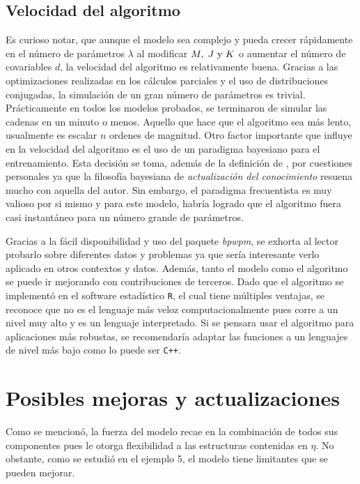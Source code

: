\documentclass[../Main/Main.tex]{subfiles}
\begin{document}
\subsection*{Velocidad del algoritmo}
Es curioso notar, que aunque el modelo sea complejo y pueda crecer rápidamente en el número de parámetros $\lambda$ al modificar $M,\;J\text{ y }K$ o aumentar el número de covariables $d$, la velocidad del algoritmo es relativamente buena. Gracias a las optimizaciones realizadas en los cálculos parciales y el uso de distribuciones conjugadas, la simulación de un gran número de parámetros es trivial. Prácticamente en todos los modelos probados, se terminaron de simular las cadenas en un minuto o menos. Aquello que hace que el algoritmo sea más lento, usualmente es escalar $n$ ordenes de magnitud. Otro factor importante que influye en la velocidad del algoritmo es el uso de un paradigma bayesiano para el entrenamiento. Esta decisión se toma, además de la definición de \citet{albert1993bayesian}, por cuestiones personales ya que la filosofía bayesiana de \textit{actualización del conocimiento} resuena mucho con aquella del autor. Sin embargo, el paradigma frecuentista es muy valioso por si mismo y para este modelo, habría logrado que el algoritmo fuera casi instantáneo para un número grande de parámetros.

Gracias a la fácil disponibilidad y uso del paquete \textit{bpwpm}, se exhorta al lector probarlo sobre diferentes datos y problemas ya que sería interesante verlo aplicado en otros contextos y datos. Además, tanto el modelo como el algoritmo se puede ir mejorando con contribuciones de terceros. Dado que el algoritmo se implementó en el software estadístico \verb|R|, el cual tiene múltiples ventajas, se reconoce que no es el lenguaje más veloz computacionalmente pues corre a un nivel muy alto y es un lenguaje interpretado. Si se pensara usar el algoritmo para aplicaciones más robustas, se recomendaría adaptar las funciones a un lenguajes de nivel más bajo como lo puede ser \verb|C++|.

\section{Posibles mejoras y actualizaciones}
Como se mencionó, la fuerza del modelo recae en la combinación de todos sus componentes pues le otorga flexibilidad a las estructuras contenidas en $\eta$. No obstante, como se estudió en el ejemplo 5, el modelo tiene limitantes que se pueden mejorar. 
\end{document}
